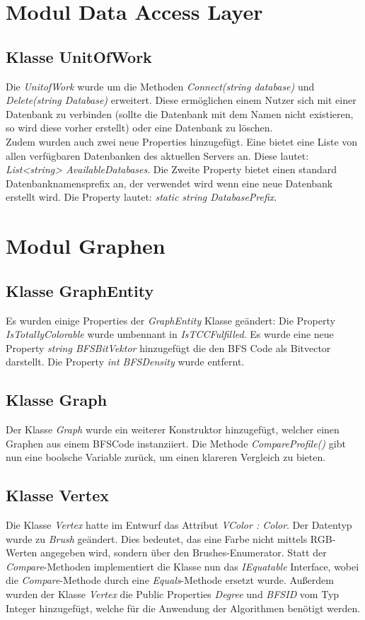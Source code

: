 \documentclass[13pt]{scrreprt}
\begin{document}
\section{Modul Data Access Layer}
	\subsection{Klasse UnitOfWork}
	Die \textit{UnitofWork} wurde um die Methoden \textit{Connect(string database)} und \textit{Delete(string Database)} erweitert. Diese ermöglichen einem Nutzer sich mit einer Datenbank zu verbinden (sollte die Datenbank mit dem Namen nicht existieren, so wird diese vorher erstellt) oder eine Datenbank zu löschen.
	\\
	Zudem wurden auch zwei neue Properties hinzugefügt. Eine bietet eine Liste von allen verfügbaren Datenbanken des aktuellen Servers an. Diese lautet: \textit{List<string> AvailableDatabases}. Die Zweite Property bietet einen standard Datenbanknamensprefix an, der verwendet wird wenn eine neue Datenbank erstellt wird. Die Property lautet: \textit{static string DatabasePrefix}.

\section{Modul Graphen}
	\subsection{Klasse GraphEntity}
	Es wurden einige Properties der \textit{GraphEntity} Klasse geändert:
	\newline
	Die Property \textit{IsTotallyColorable} wurde umbennant in \textit{IsTCCFulfilled}.
	\newline
	Es wurde eine neue Property \textit{string BFSBitVektor} hinzugefügt die den BFS Code als Bitvector darstellt.
	\newline
	Die Property \textit{int BFSDensity} wurde entfernt.
	
	\newpage
	\subsection{Klasse Graph}
	Der Klasse \textit{Graph} wurde ein weiterer Konstruktor hinzugefügt, welcher einen Graphen aus einem BFSCode instanziiert. 
	Die Methode \textit{CompareProfile()} gibt nun eine boolsche Variable zurück, um einen klareren Vergleich zu bieten.
		
	\subsection{Klasse Vertex}
	Die Klasse \textit{Vertex} hatte im Entwurf das Attribut \textit{VColor : Color}. Der Datentyp wurde zu \textit{Brush} geändert.
	Dies bedeutet, das eine Farbe nicht mittels RGB-Werten angegeben wird, sondern über den Brushes-Enumerator.
	Statt der \textit{Compare}-Methoden implementiert die Klasse nun das \textit{IEquatable} Interface, wobei die \textit{Compare}-Methode durch eine \textit{Equals}-Methode ersetzt wurde.
	Außerdem wurden der Klasse \textit{Vertex} die Public Properties \textit{Degree} und \textit{BFSID} vom Typ Integer hinzugefügt, welche für die Anwendung der Algorithmen benötigt werden.
	
\end{document}
